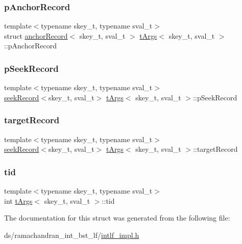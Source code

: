 \mbox{\label{structtArgs_a6a8c3056aaae3f728b301bb0a859aa32}} 
\subsubsection{\texorpdfstring{p\+Anchor\+Record}{pAnchorRecord}}
{\footnotesize\ttfamily template$<$typename skey\+\_\+t, typename sval\+\_\+t$>$ \\
struct \hyperlink{structanchorRecord}{anchor\+Record}$<$ skey\+\_\+t, sval\+\_\+t $>$ \hyperlink{structtArgs}{t\+Args}$<$ skey\+\_\+t, sval\+\_\+t $>$\+::p\+Anchor\+Record}

\mbox{\label{structtArgs_a2e843aefca73932645827aeb98a3f620}} 
\subsubsection{\texorpdfstring{p\+Seek\+Record}{pSeekRecord}}
{\footnotesize\ttfamily template$<$typename skey\+\_\+t, typename sval\+\_\+t$>$ \\
\hyperlink{structseekRecord}{seek\+Record}$<$skey\+\_\+t, sval\+\_\+t$>$ \hyperlink{structtArgs}{t\+Args}$<$ skey\+\_\+t, sval\+\_\+t $>$\+::p\+Seek\+Record}

\mbox{\label{structtArgs_a8f559d067821fb34b64a5e734e0d6025}} 
\subsubsection{\texorpdfstring{target\+Record}{targetRecord}}
{\footnotesize\ttfamily template$<$typename skey\+\_\+t, typename sval\+\_\+t$>$ \\
\hyperlink{structseekRecord}{seek\+Record}$<$skey\+\_\+t, sval\+\_\+t$>$ \hyperlink{structtArgs}{t\+Args}$<$ skey\+\_\+t, sval\+\_\+t $>$\+::target\+Record}

\mbox{\label{structtArgs_a320de799cc255dd57991133442937738}} 
\subsubsection{\texorpdfstring{tid}{tid}}
{\footnotesize\ttfamily template$<$typename skey\+\_\+t, typename sval\+\_\+t$>$ \\
int \hyperlink{structtArgs}{t\+Args}$<$ skey\+\_\+t, sval\+\_\+t $>$\+::tid}



The documentation for this struct was generated from the following file\+:\begin{DoxyCompactItemize}
\item 
ds/ramachandran\+\_\+int\+\_\+bst\+\_\+lf/\hyperlink{intlf__impl_8h}{intlf\+\_\+impl.\+h}\end{DoxyCompactItemize}
